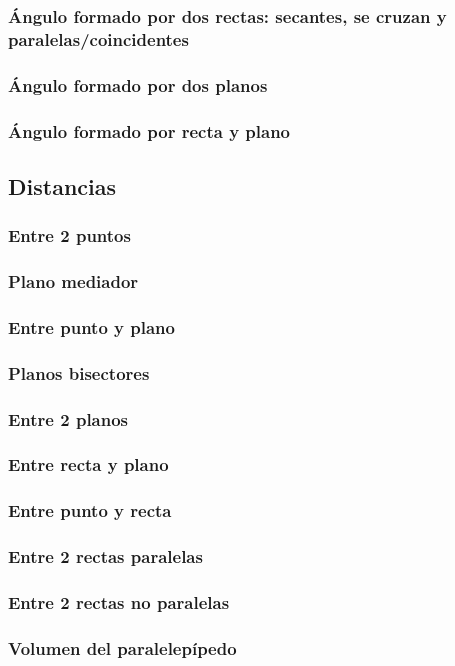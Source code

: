 \subsubsection{Ángulo formado por dos rectas: secantes, se cruzan y paralelas/coincidentes}
\subsubsection{Ángulo formado por dos planos}
\subsubsection{Ángulo formado por recta y plano}

\subsection{Distancias}
\subsubsection{Entre 2 puntos}
\subsubsection{Plano mediador}
\subsubsection{Entre punto y plano}
\subsubsection{Planos bisectores}
\subsubsection{Entre 2 planos}
\subsubsection{Entre recta y plano}
\subsubsection{Entre punto y recta}
\subsubsection{Entre 2 rectas paralelas}
\subsubsection{Entre 2 rectas no paralelas}

\subsubsection{Volumen del paralelepípedo}
